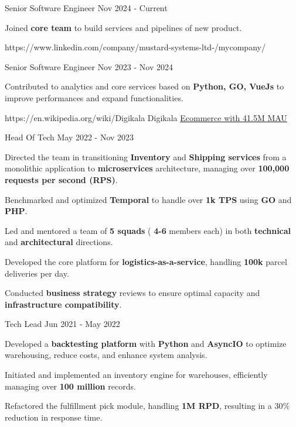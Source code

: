 \documentclass[
	10pt, %
]{FreemanCV}
\begin{document}
\begin{paracol}{2}
\position
{Senior Software Engineer}
{Nov 2024 - Current}
{
	
	\item Joined \textbf{core team} to build services and pipelines of new product.
}


\company
{https://www.linkedin.com/company/mustard-systems-ltd-/mycompany/}
{}
{}


\position
{Senior Software Engineer}
{Nov 2023 - Nov 2024}
{

	\item Contributed to analytics and core services based on \textbf{Python, GO, VueJs} to improve performances and expand functionalities.
}
\vspace{5pt}
\company
{https://en.wikipedia.org/wiki/Digikala}
{Digikala}
{\href{https://about.digikala.com/en/reports/digikala1401/}{Ecommerce with 41.5M MAU}}

\position
{Head Of Tech}
{May 2022 - Nov 2023}
{
	
	\item Directed the team in transitioning \textbf{Inventory} and \textbf{Shipping services} from a monolithic application to \textbf{microservices} architecture, managing over \textbf{100,000 requests per second (RPS)}.
	\item Benchmarked and optimized \textbf{Temporal} to handle over \textbf{1k TPS} using \textbf{GO} and \textbf{PHP}.
	\item Led and mentored a team of \textbf{5 squads} (
	\textbf{4-6} members each) in both \textbf{technical} and \textbf{architectural} directions.
	\item Developed the core platform for \textbf{logistics-as-a-service}, handling \textbf{100k} parcel deliveries per day.
	\item Conducted \textbf{business strategy} reviews to ensure optimal capacity and \textbf{infrastructure compatibility}.

}

\position
{Tech Lead}
{Jun 2021 - May 2022}
{
\item Developed a \textbf{backtesting platform} with \textbf{Python} and \textbf{AsyncIO} to optimize warehousing, reduce costs, and enhance system analysis.
	\item Initiated and implemented an inventory engine for warehouses, efficiently managing over \textbf{100 million} records.
	\item Refactored the fulfillment pick module, handling \textbf{1M RPD}, resulting in a 30\% reduction in response time.
}


\end{paracol}
\end{document}
